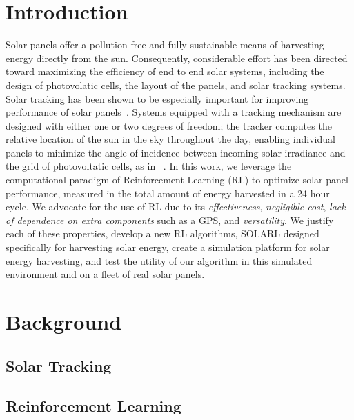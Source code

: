 \documentclass[11pt]{article}
\begin{document}
\section{Introduction}
Solar panels offer a pollution free and fully sustainable means of harvesting energy directly from the sun. Consequently, considerable effort has been directed toward maximizing the efficiency of end to end solar systems, including the design of photovolatic cells, the layout of the panels, and solar tracking systems. Solar tracking has been shown to be especially important for improving performance of solar panels~\cite{Eke2012,Rizk2008,King2001}. Systems equipped with a tracking mechanism are designed with either one or two degrees of freedom; the tracker computes the relative location of the sun in the sky throughout the day, enabling individual panels to minimize the angle of incidence between incoming solar irradiance and the grid of photovoltatic cells, as in ~\citet{Eke2012,Benghanem2011,King2001}. In this work, we leverage the computational paradigm of Reinforcement Learning (RL) to optimize solar panel performance, measured in the total amount of energy harvested in a 24 hour cycle. We advocate for the use of RL due to its {\it effectiveness}, {\it negligible cost}, {\it lack of dependence on extra components} such as a GPS, and {\it versatility}. We justify each of these properties, develop a new RL algorithms, \textsc{SOLARL} designed specifically for harvesting solar energy, create a simulation platform for solar energy harvesting, and test the utility of our algorithm in this simulated environment and on a fleet of real solar panels.



\section{Background}


\subsection{Solar Tracking}

\subsection{Reinforcement Learning}



\end{document}

